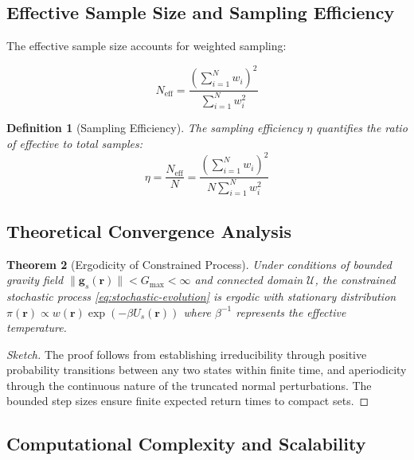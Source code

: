 \documentclass[11pt,a4paper]{article}
\newtheorem{theorem}{Theorem}[section]
\newtheorem{definition}[theorem]{Definition}
\begin{document}
\subsection{Effective Sample Size and Sampling Efficiency}

The effective sample size accounts for weighted sampling:

\begin{equation}
N_{\text{eff}} = \frac{\left(\sum_{i=1}^N w_i\right)^2}{\sum_{i=1}^N w_i^2}
\label{eq:effective-sample-size-constrained}
\end{equation}

\begin{definition}[Sampling Efficiency]
The sampling efficiency $\eta$ quantifies the ratio of effective to total samples:
\begin{equation}
\eta = \frac{N_{\text{eff}}}{N} = \frac{\left(\sum_{i=1}^N w_i\right)^2}{N \sum_{i=1}^N w_i^2}
\label{eq:sampling-efficiency}
\end{equation}
\end{definition}

\subsection{Theoretical Convergence Analysis}

\begin{theorem}[Ergodicity of Constrained Process]
Under conditions of bounded gravity field $\|\mathbf{g}_s(\mathbf{r})\| < G_{\max} < \infty$ and connected domain $\mathcal{U}$, the constrained stochastic process \eqref{eq:stochastic-evolution} is ergodic with stationary distribution $\pi(\mathbf{r}) \propto w(\mathbf{r}) \exp(-\beta U_s(\mathbf{r}))$ where $\beta^{-1}$ represents the effective temperature.
\end{theorem}

\begin{proof}[Sketch]
The proof follows from establishing irreducibility through positive probability transitions between any two states within finite time, and aperiodicity through the continuous nature of the truncated normal perturbations. The bounded step sizes ensure finite expected return times to compact sets.
\end{proof}

\subsection{Computational Complexity and Scalability}
\end{document}
